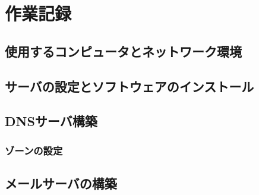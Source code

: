 \chapter{作業記録}
\section{使用するコンピュータとネットワーク環境}
\section{サーバの設定とソフトウェアのインストール}
\section{DNSサーバ構築}
\subsection{ゾーンの設定}\label{chap:ゾーンの設定}
\section{メールサーバの構築}